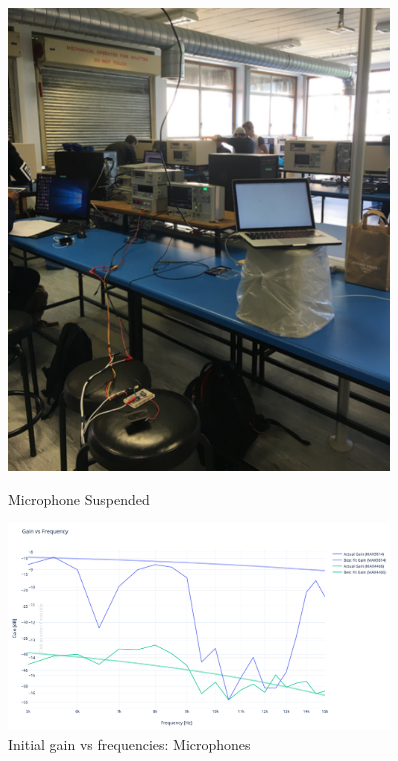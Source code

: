 \begin{figure}[h!]
    \centering
    \begin{minipage}{0.45\textwidth}
        \centering
       \includegraphics[width = 0.9\textwidth]{images/susp.pdf}
    \caption{Microphone Suspended}\label{fig:suspended}
    \end{minipage}\hfill
    \begin{minipage}{0.45\textwidth}
        \centering
        \includegraphics[width = 0.9\textwidth]{images/gainVSfreq.pdf}
    \caption{Initial gain vs frequencies: Microphones}\label{fig:gainVSfreq}
    \end{minipage}
\end{figure}

